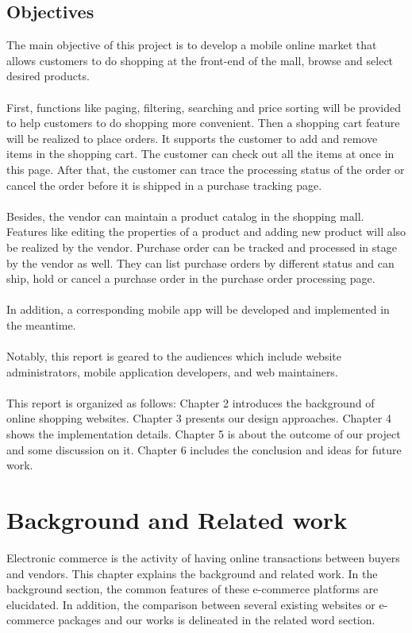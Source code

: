 \documentclass{article}
\begin{document}
\subsection{Objectives}
The main objective of this project is to develop a mobile online market that allows customers to do shopping at the front-end of the mall, browse and select desired products. 
\\\\
First, functions like paging, filtering, searching and price sorting will be provided to help customers to do shopping more convenient. Then a shopping cart feature will be realized to place orders. It supports the customer to add and remove items in the shopping cart. The customer can check out all the items at once in this page. After that, the customer can trace the processing status of the order or cancel the order before it is shipped in a purchase tracking page. 
\\\\
Besides, the vendor can maintain a product catalog in the shopping mall. Features like editing the properties of a product and adding new product will also be realized by the vendor. Purchase order can be tracked and processed in stage by the vendor as well. They can list purchase orders by different status and can ship, hold or cancel a purchase order in the purchase order processing page. 
\\\\
In addition, a corresponding mobile app will be developed and implemented in the meantime. 
\\\\
Notably, this report is geared to the audiences which include website administrators, mobile application developers, and web maintainers. 
\\\\
This report is organized as follows: Chapter 2 introduces the background of online shopping websites. Chapter 3 presents our design approaches. Chapter 4 shows the implementation details. Chapter 5 is about the outcome of our project and some discussion on it. Chapter 6 includes the conclusion and ideas for future work.

\clearpage

\section{Background and Related work}

Electronic commerce is the activity of having online transactions between buyers and vendors. This chapter explains the background and related work. In the background section, the common features of these e-commerce platforms are elucidated. In addition, the comparison between several existing websites or e-commerce packages and our works is delineated in the related word section.
\end{document}
